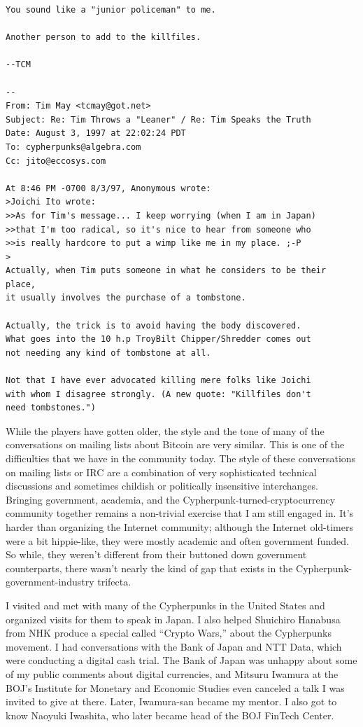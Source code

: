 \begin{verbatim}
You sound like a "junior policeman" to me.

Another person to add to the killfiles.

--TCM

--
From: Tim May <tcmay@got.net>
Subject: Re: Tim Throws a "Leaner" / Re: Tim Speaks the Truth
Date: August 3, 1997 at 22:02:24 PDT
To: cypherpunks@algebra.com
Cc: jito@eccosys.com

At 8:46 PM -0700 8/3/97, Anonymous wrote:
>Joichi Ito wrote:
>>As for Tim's message... I keep worrying (when I am in Japan)
>>that I'm too radical, so it's nice to hear from someone who
>>is really hardcore to put a wimp like me in my place. ;-P
>
Actually, when Tim puts someone in what he considers to be their
place,
it usually involves the purchase of a tombstone.

Actually, the trick is to avoid having the body discovered.
What goes into the 10 h.p TroyBilt Chipper/Shredder comes out
not needing any kind of tombstone at all.

Not that I have ever advocated killing mere folks like Joichi
with whom I disagree strongly. (A new quote: "Killfiles don't
need tombstones.")
\end{verbatim}

While the players have gotten older, the style and the tone of many of the conversations on mailing lists about Bitcoin are very similar. This is one of the difficulties that we have in the community today. The style of these conversations on mailing lists or \ac{IRC} are a combination of very sophisticated technical discussions and sometimes childish or politically insensitive interchanges. Bringing government, academia, and the Cypherpunk-turned-cryptocurrency community together remains a non-trivial exercise that I am still engaged in. It's harder than organizing the Internet community; although the Internet old-timers were a bit hippie-like, they were mostly academic and often government funded. So while, they weren't different from their buttoned down government counterparts, there wasn't nearly the kind of gap that exists in the Cypherpunk-government-industry trifecta.

I visited and met with many of the Cypherpunks in the United States and organized visits for them to speak in Japan. I also helped Shuichiro Hanabusa from NHK produce a special called ``Crypto Wars,'' about the Cypherpunks movement. I had conversations with the Bank of Japan and \ac{NTT} Data, which were conducting a digital cash trial. The Bank of Japan was unhappy about some of my public comments about digital currencies, and Mitsuru Iwamura at the \ac{BOJ}'s Institute for Monetary and Economic Studies even canceled a talk I was invited to give at there. Later, Iwamura-san became my mentor. I also got to know Naoyuki Iwashita, who later became head of the \ac{BOJ} FinTech Center.

